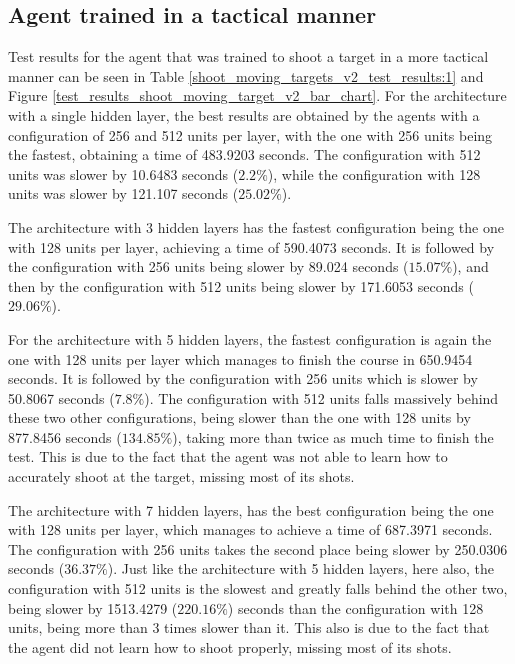 \subsection{Agent trained in a tactical manner} \label{shoot_moving_target_tactical_subsection}

Test results for the agent that was trained to shoot a target in a more tactical manner can be seen in Table \ref{shoot_moving_targets_v2_test_results:1} and Figure \ref{test_results_shoot_moving_target_v2_bar_chart}. For the architecture with a single hidden layer, the best results are obtained by the agents with a  configuration of 256 and 512 units per layer, with the one with 256 units being the fastest, obtaining a time of 483.9203 seconds. The configuration with 512 units was slower by 10.6483 seconds ($2.2\%$), while the configuration with 128 units was slower by 121.107 seconds ($25.02\%$).

The architecture with 3 hidden layers has the fastest configuration being the one with 128 units per layer, achieving a time of 590.4073 seconds. It is followed by the configuration with 256 units being slower by 89.024 seconds ($15.07\%$), and then by the configuration with 512 units being slower by 171.6053 seconds ($29.06\%$).

For the architecture with 5 hidden layers, the fastest configuration is again the one with 128 units per layer which manages to finish the course in 650.9454 seconds. It is followed by the configuration with 256 units which is slower by 50.8067 seconds ($7.8\%$). The configuration with 512 units falls massively behind these two other configurations, being slower than the one with 128 units by 877.8456 seconds ($134.85\%$), taking more than twice as much time to finish the test. This is due to the fact that the agent was not able to learn how to accurately shoot at the target, missing most of its shots.

The architecture with 7 hidden layers, has the best configuration being the one with 128 units per layer, which manages to achieve a time of 687.3971 seconds. The configuration with 256 units takes the second place being slower by 250.0306 seconds ($36.37\%$). Just like the architecture with 5 hidden layers, here also, the configuration with 512 units is the slowest and greatly falls behind the other two, being slower by 1513.4279 ($220.16\%$) seconds than the configuration with 128 units, being more than 3 times slower than it. This also is due to the fact that the agent did not learn how to shoot properly, missing most of its shots.

